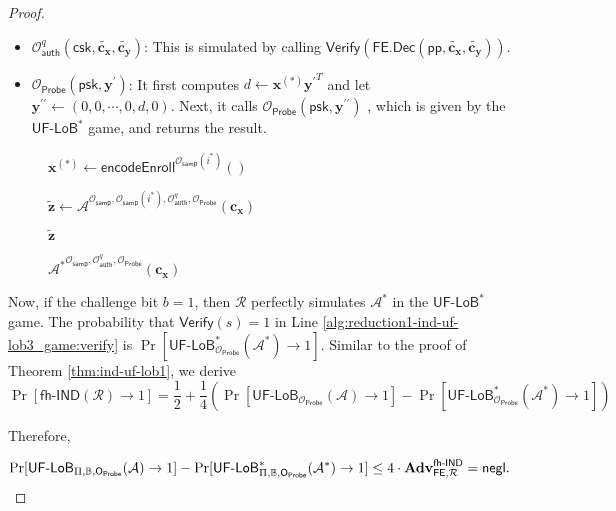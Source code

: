 \begin{proof}
\begin{itemize}
	\item $\mathcal{O}_{\textsf{auth}}^q (\textsf{csk}, \mathbf{\tilde{c_x}}, \mathbf{\tilde{c_y}})$: This is simulated by calling $\textsf{Verify}( \textsf{FE.Dec}(\textsf{pp}, \mathbf{\tilde{c_x}}, \mathbf{\tilde{c_y}}) )$.

	\item $\mathcal{O}_{\textsf{Probe}}( \textsf{psk}, \mathbf{y}^\prime )$: It first computes $d \gets \mathbf{x}^{(*)}{\mathbf{y}^\prime}^T$ and let $\mathbf{y}^{\prime\prime} \gets (0, 0, \cdots, 0, d, 0)$. Next, it calls $\mathcal{O}_{\textsf{Probe}} (\textsf{psk}, \mathbf{y}^{\prime\prime} )$ , which is given by the $\textsf{UF-LoB}^*$ game, and returns the result.

\end{itemize}

\begin{figure}[h]
\centering
	
	\begin{minipage}[t]{0.5\linewidth}
	\centering
	\begin{algorithm}[H]
	\caption{${\mathcal{A}^*}^{\mathcal{O}_\textsf{samp}, \mathcal{O}_\textsf{auth}^q, \mathcal{O}_{\textsf{Probe}} } ( \mathbf{c_x}) $}
	\label{alg:adv-ind-uf-lob3_game}
	\begin{algorithmic}[1]
		\State $\mathbf{x}^{(*)} \gets \textsf{encodeEnroll}^{ \mathcal{O}_\textsf{samp}(i^*)} ()$ 

		\State ${\mathbf{\tilde{z}}} \gets \mathcal{A}^{\mathcal{O}_{\textsf{samp}}, \mathcal{O}_{\textsf{samp}}(i^*), \mathcal{O}_\textsf{auth}^q, \mathcal{O}_{\textsf{Probe}} } ( \mathbf{c_x})$

		\State \Return ${\mathbf{\tilde{z}}}$
	\end{algorithmic}
	\end{algorithm}
	\end{minipage}
	
\label{fig:adv-ind-uf-lob3_game}
\end{figure}

Now, if the challenge bit $b = 1$, then $\mathcal{R}$ perfectly simulates $\mathcal{A}^*$ in the $\textsf{UF-LoB}^*$ game.
The probability that $\textsf{Verify}(s) = 1$ in Line \ref{alg:reduction1-ind-uf-lob3_game:verify} is $\Pr[ \textsf{UF-LoB}_{\mathcal{O}_\textsf{Probe}}^*(\mathcal{A}^*) \to 1 ]$.
Similar to the proof of Theorem \ref{thm:ind-uf-lob1}, we derive
\[
	\Pr[\textsf{fh-IND}(\mathcal{R}) \to 1]
	= \frac{1}{2} + \frac{1}{4} \left( \Pr[\textsf{UF-LoB}_{\mathcal{O}_\textsf{Probe}}(\mathcal{A}) \to 1] - \Pr[ \textsf{UF-LoB}_{\mathcal{O}_\textsf{Probe}}^*(\mathcal{A}^*) \to 1 ] \right)
\]

Therefore,

\[
	\Pr[\textsf{UF-LoB}_{\Pi, \mathbb{B}, \textsf{O}_{\textsf{Probe}}}(\mathcal{A}) \to 1] - \Pr[\textsf{UF-LoB}^*_{\Pi, \mathbb{B}, \textsf{O}_{\textsf{Probe}} }(\mathcal{A}^* ) \to 1] \leq 4 \cdot \mathbf{Adv}_{\textsf{FE}, \mathcal{R}}^\textsf{fh-IND} = \mathsf{negl}.
\]	


\end{proof}
